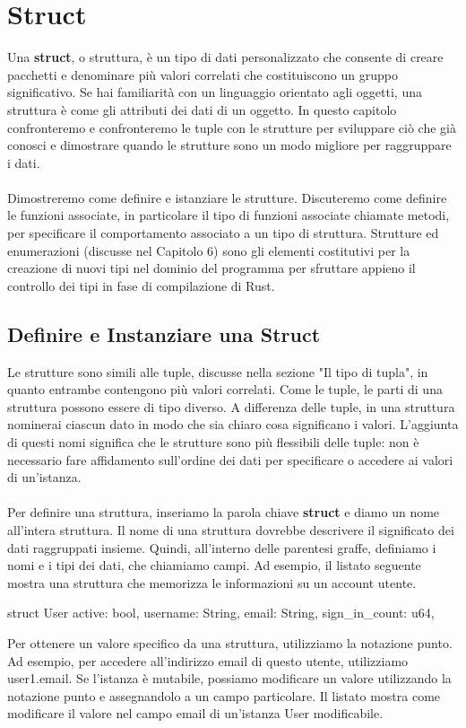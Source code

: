 \documentclass[11pt,a4paper]{article}
\begin{document}
\section{Struct}
Una \textbf{struct}, o struttura, è un tipo di dati personalizzato che consente di creare pacchetti e denominare più valori correlati che costituiscono un gruppo significativo. Se hai familiarità con un linguaggio orientato agli oggetti, una struttura è come gli attributi dei dati di un oggetto. In questo capitolo confronteremo e confronteremo le tuple con le strutture per sviluppare ciò che già conosci e dimostrare quando le strutture sono un modo migliore per raggruppare i dati.\\
\\
Dimostreremo come definire e istanziare le strutture. Discuteremo come definire le funzioni associate, in particolare il tipo di funzioni associate chiamate metodi, per specificare il comportamento associato a un tipo di struttura. Strutture ed enumerazioni (discusse nel Capitolo 6) sono gli elementi costitutivi per la creazione di nuovi tipi nel dominio del programma per sfruttare appieno il controllo dei tipi in fase di compilazione di Rust.

\subsection{Definire e Instanziare una Struct}
Le strutture sono simili alle tuple, discusse nella sezione "Il tipo di tupla", in quanto entrambe contengono più valori correlati. Come le tuple, le parti di una struttura possono essere di tipo diverso. A differenza delle tuple, in una struttura nominerai ciascun dato in modo che sia chiaro cosa significano i valori. L'aggiunta di questi nomi significa che le strutture sono più flessibili delle tuple: non è necessario fare affidamento sull'ordine dei dati per specificare o accedere ai valori di un'istanza.\\
\\
Per definire una struttura, inseriamo la parola chiave \textbf{struct} e diamo un nome all'intera struttura. Il nome di una struttura dovrebbe descrivere il significato dei dati raggruppati insieme. Quindi, all'interno delle parentesi graffe, definiamo i nomi e i tipi dei dati, che chiamiamo campi. Ad esempio, il listato seguente mostra una struttura che memorizza le informazioni su un account utente.

\begin{rust}
struct User {
    active: bool,
    username: String,
    email: String,
    sign_in_count: u64,
}
\end{rust}
Per ottenere un valore specifico da una struttura, utilizziamo la notazione punto. Ad esempio, per accedere all'indirizzo email di questo utente, utilizziamo user1.email. Se l'istanza è mutabile, possiamo modificare un valore utilizzando la notazione punto e assegnandolo a un campo particolare. Il listato mostra come modificare il valore nel campo email di un'istanza User modificabile.
\end{document}
